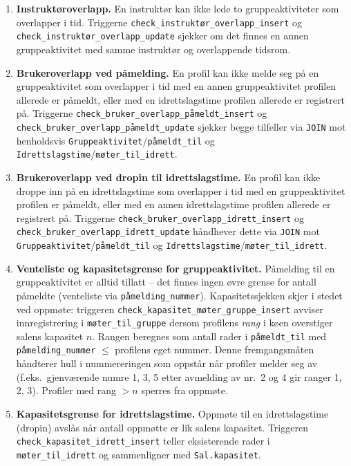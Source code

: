 \begin{enumerate}
    \item \textbf{Instruktøroverlapp.}
    En instruktør kan ikke lede to gruppeaktiviteter som overlapper i tid.
    Triggerne \texttt{check\_instruktør\_overlapp\_insert} og
    \texttt{check\_instruktør\_overlapp\_update} sjekker om det finnes en
    annen gruppeaktivitet med samme instruktør og overlappende tidsrom.

    \item \textbf{Brukeroverlapp ved påmelding.}
    En profil kan ikke melde seg på en gruppeaktivitet som overlapper i tid
    med en annen gruppeaktivitet profilen allerede er påmeldt,
    eller med en idrettslagstime profilen allerede er registrert på.
    Triggerne \texttt{check\_bruker\_overlapp\_påmeldt\_insert} og
    \texttt{check\_bruker\_overlapp\_påmeldt\_update} sjekker begge tilfeller
    via \texttt{JOIN} mot henholdsvis \texttt{Gruppeaktivitet}/\texttt{påmeldt\_til}
    og \texttt{Idrettslagstime}/\texttt{møter\_til\_idrett}.

    \item \textbf{Brukeroverlapp ved dropin til idrettslagstime.}
    En profil kan ikke droppe inn på en idrettslagstime som overlapper i tid
    med en gruppeaktivitet profilen er påmeldt,
    eller med en annen idrettslagstime profilen allerede er registrert på.
    Triggerne \texttt{check\_bruker\_overlapp\_idrett\_insert} og
    \texttt{check\_bruker\_overlapp\_idrett\_update} håndhever dette
    via \texttt{JOIN} mot \texttt{Gruppeaktivitet}/\texttt{påmeldt\_til}
    og \texttt{Idrettslagstime}/\texttt{møter\_til\_idrett}.

    \item \textbf{Venteliste og kapasitetsgrense for gruppeaktivitet.}
    Påmelding til en gruppeaktivitet er alltid tillatt – det finnes ingen
    øvre grense for antall påmeldte (venteliste via
    \texttt{påmelding\_nummer}). Kapasitetssjekken skjer i stedet ved
    oppmøte: triggeren \texttt{check\_kapasitet\_møter\_gruppe\_insert}
    avviser innregistrering i \texttt{møter\_til\_gruppe} dersom profilens
    \emph{rang} i køen overstiger salens kapasitet $n$.
    Rangen beregnes som antall rader i \texttt{påmeldt\_til} med
    \texttt{påmelding\_nummer} $\leq$ profilens eget nummer.
    Denne fremgangsmåten håndterer hull i nummereringen som oppstår når
    profiler melder seg av (f.eks.\ gjenværende numre 1, 3, 5 etter
    avmelding av nr.\ 2 og 4 gir ranger 1, 2, 3).
    Profiler med rang $>n$ sperres fra oppmøte.

    \item \textbf{Kapasitetsgrense for idrettslagstime.}
    Oppmøte til en idrettslagstime (dropin) avslås når antall oppmøtte er
    lik salens kapasitet. Triggeren \texttt{check\_kapasitet\_idrett\_insert}
    teller eksisterende rader i \texttt{møter\_til\_idrett} og sammenligner
    med \texttt{Sal.kapasitet}.
\end{enumerate}

